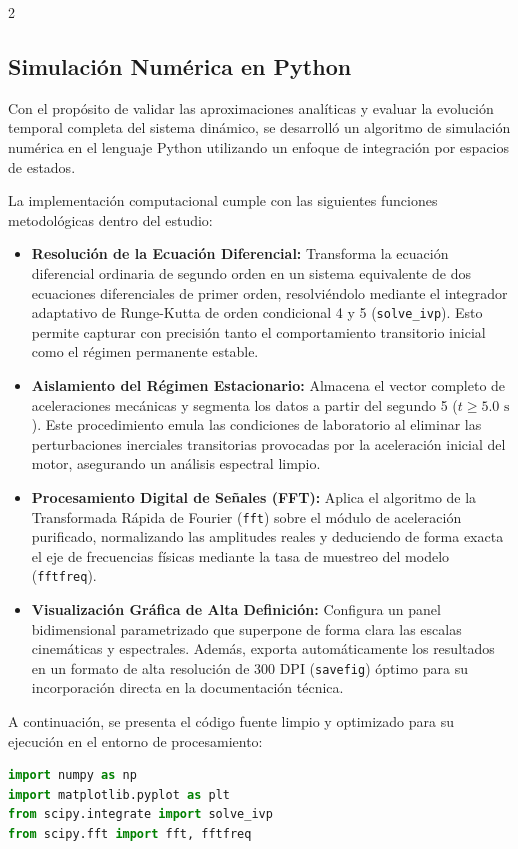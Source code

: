 \documentclass[10pt]{article}
\begin{document}
\begin{multicols}{2}
\subsection{Simulación Numérica en Python}

Con el propósito de validar las aproximaciones analíticas y evaluar la evolución temporal completa del sistema dinámico, se desarrolló un algoritmo de simulación numérica en el lenguaje Python utilizando un enfoque de integración por espacios de estados. 

La implementación computacional cumple con las siguientes funciones metodológicas dentro del estudio:
\begin{itemize}
    \item \textbf{Resolución de la Ecuación Diferencial:} Transforma la ecuación diferencial ordinaria de segundo orden en un sistema equivalente de dos ecuaciones diferenciales de primer orden, resolviéndolo mediante el integrador adaptativo de Runge-Kutta de orden condicional 4 y 5 (\texttt{solve\_ivp}). Esto permite capturar con precisión tanto el comportamiento transitorio inicial como el régimen permanente estable.
    \item \textbf{Aislamiento del Régimen Estacionario:} Almacena el vector completo de aceleraciones mecánicas y segmenta los datos a partir del segundo 5 ($t \geq 5.0\text{ s}$). Este procedimiento emula las condiciones de laboratorio al eliminar las perturbaciones inerciales transitorias provocadas por la aceleración inicial del motor, asegurando un análisis espectral limpio.
    \item \textbf{Procesamiento Digital de Señales (FFT):} Aplica el algoritmo de la Transformada Rápida de Fourier (\texttt{fft}) sobre el módulo de aceleración purificado, normalizando las amplitudes reales y deduciendo de forma exacta el eje de frecuencias físicas mediante la tasa de muestreo del modelo (\texttt{fftfreq}).
    \item \textbf{Visualización Gráfica de Alta Definición:} Configura un panel bidimensional parametrizado que superpone de forma clara las escalas cinemáticas y espectrales. Además, exporta automáticamente los resultados en un formato de alta resolución de 300 DPI (\texttt{savefig}) óptimo para su incorporación directa en la documentación técnica.
\end{itemize}

A continuación, se presenta el código fuente limpio y optimizado para su ejecución en el entorno de procesamiento:

\begin{lstlisting}[language=Python, caption={Algoritmo de integración numérica y análisis espectral FFT en Python.}, label={code:simulacion_oscilador}]
import numpy as np
import matplotlib.pyplot as plt
from scipy.integrate import solve_ivp
from scipy.fft import fft, fftfreq


\end{lstlisting}
\end{multicols}
\end{document}
